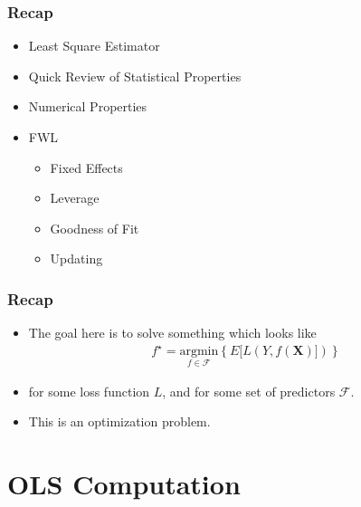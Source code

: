 \documentclass[
  shownotes,
  xcolor={svgnames},
  hyperref={colorlinks,citecolor=DarkBlue,linkcolor=DarkRed,urlcolor=DarkBlue}
  , aspectratio=169]{beamer}
\begin{document}
\begin{frame}
\frametitle{Recap}


  \begin{itemize} 
    \item Least Square Estimator
    \medskip
    \item Quick Review of Statistical Properties
    \medskip
    \item Numerical Properties
    \medskip
    \item FWL
    \begin{itemize}
    \item Fixed Effects
    \item Leverage
    \item Goodness of Fit
    \item Updating
  \end{itemize}
  \end{itemize}
  
\end{frame}
\begin{frame}[fragile]
\frametitle{Recap}

\begin{itemize}

      \item The goal here is to solve something which looks like
    \begin{align}
    f^\star=\underset{f\in\mathcal{F}}{\text{argmin}}\left\lbrace E [L(Y,f(\mathbf{X})]) \right\rbrace
    \end{align}
\medskip
\item for some loss function $L$, and for some set of predictors $\mathcal{F}$. 
\medskip
\item This is an optimization problem. 

\end{itemize}


\end{frame}


\section{OLS Computation}
\end{document}
